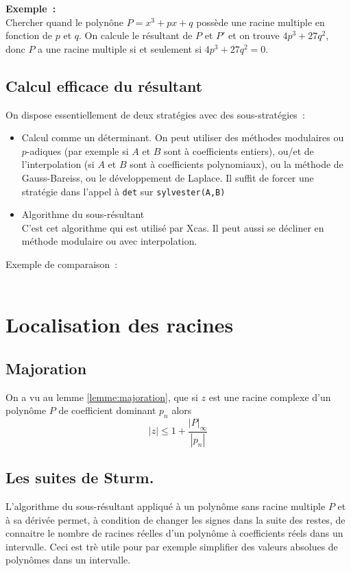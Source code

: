 \documentclass[a4paper,11pt]{book}
\begin{document}
\begin{giacjshere}
{\bf Exemple~:}\\ 
Chercher quand le polyn\^one $P=x^3+px+q$ poss\`ede
une racine multiple en fonction de $p$ et $q$. On calcule le
r\'esultant de $P$ et $P'$ et on trouve $4p^3+27q^2$, donc $P$
a une racine multiple si et seulement si $4p^3+27q^2=0$.

\section{Calcul efficace du r\'esultant}
On dispose essentiellement de deux strat\'egies avec des sous-strat\'egies~:
\begin{itemize}
\item Calcul comme un d\'eterminant.
On peut utiliser des m\'ethodes modulaires ou $p$-adiques (par exemple
si $A$ et $B$ sont \`a coefficients entiers), ou/et de l'interpolation
(si $A$ et $B$ sont \`a coefficients polynomiaux), ou la m\'ethode
de Gauss-Bareiss, ou le d\'eveloppement de Laplace. Il suffit
de forcer une strat\'egie dans l'appel \`a \verb|det| sur
\verb|sylvester(A,B)|
\item Algorithme du sous-r\'esultant\\
C'est cet algorithme qui est utilis\'e par Xcas.
Il peut aussi se d\'ecliner en m\'ethode modulaire ou avec interpolation.
\end{itemize}
Exemple de comparaison~:\\
\\

\chapter{Localisation des racines} \label{sec:racines}
\section{Majoration}
On a vu au lemme \ref{lemme:majoration}, 
que si $z$ est une racine complexe d'un polyn\^ome $P$ 
de coefficient dominant $p_n$ alors
$$ |z| \leq 1 + \frac{|P|_\infty}{|p_n|}$$ 

\section{Les suites de Sturm.}
L'algorithme du sous-r\'esultant appliqu\'e \`a un polyn\^ome sans
racine multiple $P$ et \`a sa d\'eriv\'ee
permet, \`a condition de changer les signes dans la suite des restes, 
de connaitre le nombre de racines r\'eelles d'un polyn\^ome 
\`a coefficients r\'eels dans un 
intervalle. Ceci est tr\`e utile pour par exemple simplifier des valeurs
absolues de polyn\^omes dans un intervalle.


\end{giacjshere}
\end{document}
